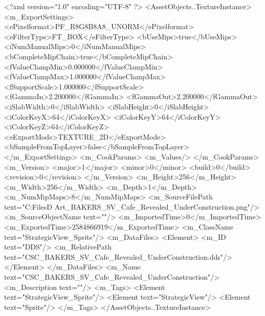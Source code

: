<?xml version="1.0" encoding="UTF-8" ?>
<AssetObjects..TextureInstance>
	<m_ExportSettings>
		<ePixelformat>PF_R8G8B8A8_UNORM</ePixelformat>
		<eFilterType>FT_BOX</eFilterType>
		<bUseMips>true</bUseMips>
		<iNumManualMips>0</iNumManualMips>
		<bCompleteMipChain>true</bCompleteMipChain>
		<fValueClampMin>0.000000</fValueClampMin>
		<fValueClampMax>1.000000</fValueClampMax>
		<fSupportScale>1.000000</fSupportScale>
		<fGammaIn>2.200000</fGammaIn>
		<fGammaOut>2.200000</fGammaOut>
		<iSlabWidth>0</iSlabWidth>
		<iSlabHeight>0</iSlabHeight>
		<iColorKeyX>64</iColorKeyX>
		<iColorKeyY>64</iColorKeyY>
		<iColorKeyZ>64</iColorKeyZ>
		<eExportMode>TEXTURE_2D</eExportMode>
		<bSampleFromTopLayer>false</bSampleFromTopLayer>
	</m_ExportSettings>
	<m_CookParams>
		<m_Values/>
	</m_CookParams>
	<m_Version>
		<major>1</major>
		<minor>0</minor>
		<build>0</build>
		<revision>0</revision>
	</m_Version>
	<m_Height>256</m_Height>
	<m_Width>256</m_Width>
	<m_Depth>1</m_Depth>
	<m_NumMipMaps>8</m_NumMipMaps>
	<m_SourceFilePath text="C:\Users\Shadow\Desktop\Working Files\2D Art\Quarters\Bakers\StrategicView\CSC_BAKERS_SV_Cafe_Revealed_UnderConstruction.png"/>
	<m_SourceObjectName text=""/>
	<m_ImportedTime>0</m_ImportedTime>
	<m_ExportedTime>2584866919</m_ExportedTime>
	<m_ClassName text="StrategicView_Sprite"/>
	<m_DataFiles>
		<Element>
			<m_ID text="DDS"/>
			<m_RelativePath text="CSC_BAKERS_SV_Cafe_Revealed_UnderConstruction.dds"/>
		</Element>
	</m_DataFiles>
	<m_Name text="CSC_BAKERS_SV_Cafe_Revealed_UnderConstruction"/>
	<m_Description text=""/>
	<m_Tags>
		<Element text="StrategicView_Sprite"/>
		<Element text="StrategicView"/>
		<Element text="Sprite"/>
	</m_Tags>
</AssetObjects..TextureInstance>

